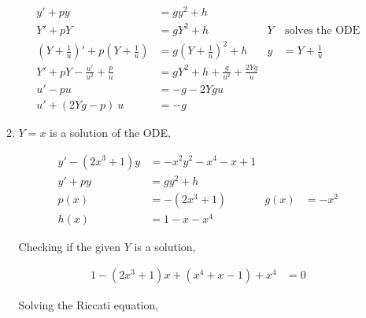 \begin{enumerate}
\begin{enumerate}
                    \begin{align}
                        y' + py                                                           & = gy^{2} + h                                                                \\
                        Y' +pY                                                            & = gY^{2} + h                                  & Y & \ \text{solves the ODE} \\
                        \left( Y + \frac{1}{u} \right)' + p\left( Y + \frac{1}{u} \right) & = g\left( Y + \frac{1}{u} \right)^{2} + h     & y & = Y + \frac{1}{u}       \\
                        Y' + pY -\frac{u'}{u^{2}} + \frac{p}{u}                           & = gY^{2} + h + \frac{g}{u^{2}} +\frac{2Yg}{u}                               \\
                        u' - pu                                                           & = -g - 2Ygu                                                                 \\
                        u' + (2Yg - p)\ u                                                 & = -g
                    \end{align}


              \item $ Y = x $ is a solution of the ODE,

                    \begin{align}
                        y' - (2x^{3} + 1)y & = -x^{2}y^{2}-x^{4} -x +1                   \\
                        y' + py            & = gy^{2} + h                                \\
                        p(x)               & = -(2x^{3} + 1)           & g(x) & = -x^{2} \\
                        h(x)               & = 1 - x - x^{4}
                    \end{align}

                    Checking if the given $ Y $ is a solution,

                    \begin{align}
                        1 - (2x^{3} + 1)x + (x^{4} + x -1) + x^{4} & = 0
                    \end{align}

                    Solving the Riccati equation,


\end{enumerate}
\end{enumerate}
